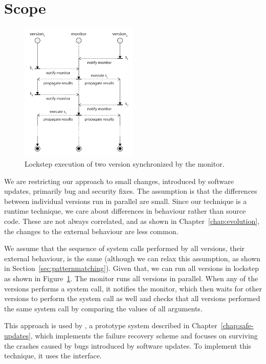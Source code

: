 \section{Scope}
\label{multi-version:scope}

\begin{figure}[t]
  \begin{center}
    \includegraphics[width=0.5\textwidth]{multi-version/figures/lockstep}
    \caption{Lockstep execution of two version synchronized by the monitor.}
    \label{fig:lockstep-execution}
  \end{center}
\end{figure}

We are restricting our approach to small changes, introduced by software
updates, primarily bug and security fixes. The assumption is that the differences
between individual versions run in parallel are small. Since our technique
is a runtime technique, we care about differences in behaviour rather than
source code. These are not always correlated, and as shown in
Chapter~\ref{chap:evolution}, the changes to the external behaviour are less
common.

We assume that the sequence of system calls performed by all versions, \ie
their external behaviour, is the same (although we can relax this assumption,
as shown in Section~\ref{sec:patternmatching}). Given that, we can run all
versions in lockstep as shown in Figure~\ref{fig:lockstep-execution}.  The
monitor runs all versions in parallel. When any of the versions performs a
system call, it notifies the monitor, which then waits for other versions to
perform the system call as well and checks that all versions performed the same
system call by comparing the values of all arguments.

This approach is used by \mx, a prototype system described in
Chapter~\ref{chap:safe-updates}, which implements the failure recovery scheme
and focuses on surviving the crashes caused by bugs introduced by software
updates. To implement this technique, it uses the \ptrace interface.

